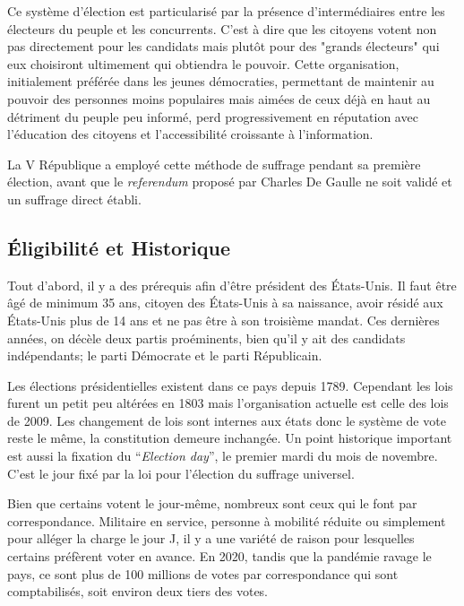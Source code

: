 \documentclass[11pt,a4paper]{report}
\begin{document}
Ce système d'élection est particularisé par la présence d'intermédiaires entre les électeurs du peuple et les concurrents. 
C'est à dire que les citoyens votent non pas directement pour les candidats mais plutôt pour des "grands électeurs" qui eux choisiront ultimement qui obtiendra le pouvoir.
Cette organisation, initialement préférée dans les jeunes démocraties, permettant de maintenir au pouvoir des personnes moins populaires mais aimées de ceux déjà en haut au détriment du peuple peu informé, perd progressivement en réputation avec l'éducation des citoyens et l'accessibilité croissante à l'information.
\nocite{wiki:scrutinindir}

La V République a employé cette méthode de suffrage pendant sa première élection, avant que le \textit{referendum} proposé par Charles De Gaulle ne soit validé et un suffrage direct établi. \nocite{polmania:scrutins}

\subsection{Éligibilité et Historique}

Tout d’abord, il y a des prérequis afin d’être président des États-Unis.
Il faut être âgé de minimum 35 ans, citoyen des États-Unis à sa naissance, avoir résidé aux États-Unis plus de 14 ans et ne pas être à son troisième mandat.
Ces dernières années, on décèle deux partis proéminents, bien qu'il y ait des candidats indépendants; le parti Démocrate et le parti Républicain.

Les élections présidentielles existent dans ce pays depuis 1789.
Cependant les lois furent un petit peu altérées en 1803 mais l'organisation actuelle est celle des lois de 2009.
Les changement de lois sont internes aux états donc le système de vote reste le même, la constitution demeure inchangée.
Un point historique important est aussi la fixation du “\textit{Election day}”, le premier mardi du mois de novembre.
C’est le jour fixé par la loi pour l'élection du suffrage universel.

Bien que certains votent le jour-même, nombreux sont ceux qui le font par correspondance.
Militaire en service, personne à mobilité réduite ou simplement pour alléger la charge le jour J, il y a une variété de raison pour lesquelles certains préfèrent voter en avance.
En 2020, tandis que la pandémie ravage le pays, ce sont plus de 100 millions de votes par correspondance qui sont comptabilisés, soit environ deux tiers des votes. \nocite{electproj:electproj}
\end{document}

